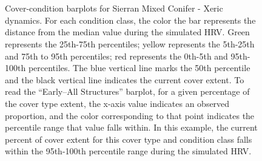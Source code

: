 \begin{figure}[!htbp]
  \\%
  \\%
    \\%
    \\%
    \\%
    \\%
    \\%
  \caption{Cover-condition barplots for Sierran Mixed Conifer - Xeric dynamics. For each condition class, the color the bar represents the distance from the median value during the simulated HRV. Green represents the 25th-75th percentiles; yellow represents the 5th-25th and 75th to 95th percentiles; red represents the 0th-5th and 95th-100th percentiles. The blue vertical line marks the 50th percentile and the black vertical line indicates the current cover extent. To read the ``Early–All Structures'' barplot, for a given percentage of the cover type extent, the x-axis value indicates an observed proportion, and the color corresponding to that point indicates the percentile range that value falls within. In this example, the current percent of cover extent for this cover type and condition class falls within the 95th-100th percentile range during the simulated HRV.}
  \label{fig:covcondbar_smcx}
\end{figure}

